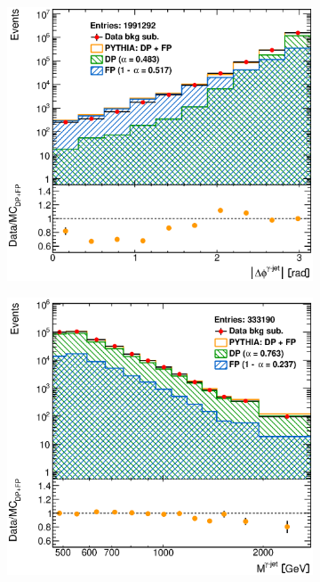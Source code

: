 \documentclass[12pt, twoside]{article}
\numberwithin{equation}{section}
\numberwithin{figure}{section}
\newenvironment{changemargin}[2]{%
\begin{list}{}{%
\setlength{\topsep}{0pt}%
\setlength{\leftmargin}{#1}%
\setlength{\rightmargin}{#2}%
\setlength{\listparindent}{\parindent}%
\setlength{\itemindent}{\parindent}%
\setlength{\parsep}{\parskip}%
}%
\item[]}{\end{list}}
\begin{document}
\begin{figure}[H]
\begin{changemargin}{-1.0cm}{-0.75cm}
\begin{changemargin}{-0.75cm}{-1.0cm}
        \vspace{0.2cm}
        \begin{subfigure}[b]{0.37\textwidth}
            \includegraphics[width=\textwidth]{./images/BackgroundSubtractedPythiaOptimised/OPT_SIG_EVENTS-107.eps}
            \subcaption{}
            \label{fig:BSDeltaPhiPhotonJetPYTHIA_Optimised}
        \end{subfigure}
        \begin{subfigure}[b]{0.37\textwidth}
            \includegraphics[width=\textwidth]{./images/BackgroundSubtractedPythiaOptimised/OPT_SIG_EVENTS-108.eps}

\end{subfigure}
\end{changemargin}
\end{changemargin}
\end{figure}
\end{document}
